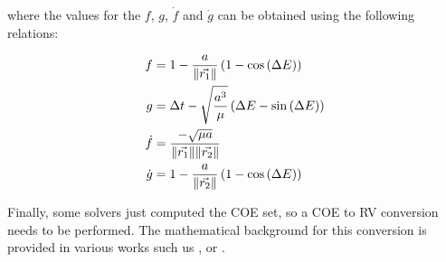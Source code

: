 where the values for the $f$, $g$, $\dot{f}$ and $\dot{g}$ can be obtained using
the following relations:

\begin{align}
  f       & = 1 - \frac{a}{\lVert\vec{r_1}\rVert} \left(1 - \cos{(\Delta E)} \right)          \\
  g       & = \Delta t - \sqrt{\frac{a^3}{\mu}} \left(\Delta E - \sin{(\Delta E)}\right) \\
  \dot{f} & = \frac{-\sqrt{\mu a}}{\lVert\vec{r_1}\rVert \lVert\vec{r_2}\rVert}                    \\
  \dot{g} & = 1 - \frac{a}{\lVert\vec{r_2}\rVert} \left(1 - \cos{(\Delta E)} \right)
\end{align}

Finally, some solvers just computed the COE set, so a COE to RV conversion needs
to be performed. The mathematical background for this conversion is provided in
various works such us \cite{bate1971}, \cite{vallado2013} or
\cite{curtis2020}.
